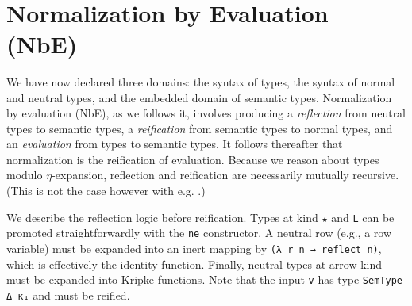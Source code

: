 \documentclass[authoryear, acmsmall, screen, review, nonacm]{acmart} %
\begin{document}
\begin{code}[hide]
\AgdaSymbol{\{}\AgdaSpace{}%
\AgdaSymbol{=}\AgdaSpace{}%
\AgdaSpace{}%
\AgdaSymbol{\}}\AgdaSpace{}%
\AgdaSymbol{\{}\AgdaSymbol{\}}\AgdaSpace{}%
\AgdaSpace{}%
\AgdaSpace{}%
\AgdaSymbol{=}\AgdaSpace{}%
\<%
\\
\>[0]\AgdaSpace{}%
\AgdaSymbol{\{}\AgdaSpace{}%
\AgdaSymbol{=}\AgdaSpace{}%
\AgdaSpace{}%
\AgdaSymbol{(}\AgdaSpace{}%
\AgdaSymbol{)\}}\AgdaSpace{}%
\AgdaSymbol{\{}\AgdaSymbol{\}}\AgdaSpace{}%
\AgdaSpace{}%
\AgdaSymbol{(}\AgdaSpace{}%
\AgdaOperator{\AgdaInductiveConstructor{,}}\AgdaSpace{}%
\AgdaSymbol{)}\AgdaSpace{}%
\AgdaSymbol{=}%
\>[53]%
\>[60]\AgdaOperator{\AgdaInductiveConstructor{,}}\AgdaSpace{}%
\AgdaSymbol{(}\AgdaSpace{}%
\AgdaSymbol{\{}\AgdaSpace{}%
\AgdaSymbol{=}\AgdaSpace{}%
\AgdaSpace{}%
\AgdaSymbol{\}}\AgdaSpace{}%
\AgdaSymbol{\{}\AgdaSpace{}%
\AgdaSpace{}%
\AgdaSymbol{\}}\AgdaSpace{}%
\AgdaSpace{}%
\AgdaSymbol{)}\<%
\end{code}


\section{Normalization by Evaluation (NbE)}

We have now declared three domains: the syntax of types, the syntax of normal and neutral types, and the embedded domain of semantic types. Normalization by evaluation (NbE), as we follows it, involves producing a \emph{reflection} from neutral types to semantic types, a \emph{reification} from semantic types to normal types, and an \emph{evaluation} from types to semantic types. It follows thereafter that normalization is the reification of evaluation. Because we reason about types modulo $\eta$-expansion, reflection and reification are necessarily mutually recursive. (This is not the case however with e.g. \citet{ChapmanKNW19}.)

We describe the reflection logic before reification. Types at kind \verb!★! and \verb!L! can be promoted straightforwardly with the \verb!ne! constructor. A neutral row (e.g., a row variable) must be expanded into an inert mapping by \verb!(λ r n → reflect n)!, which is effectively the identity function. Finally, neutral types at arrow kind must be expanded into Kripke functions. Note that the input \verb!v! has type \verb!SemType Δ κ₁! and must be reified. 
\end{document}
